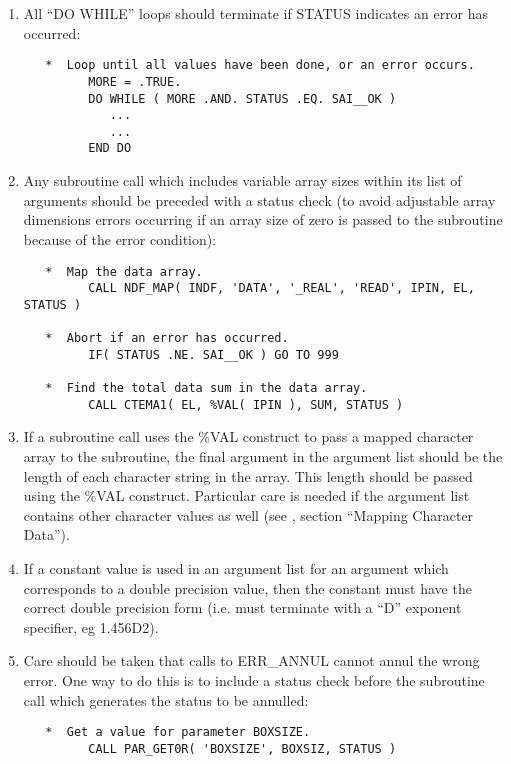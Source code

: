 \begin{enumerate}
\item All ``{\small DO WHILE}'' loops should terminate if {\small STATUS} 
indicates an error has occurred:

\small
\begin{verbatim}
   *  Loop until all values have been done, or an error occurs.
         MORE = .TRUE.
         DO WHILE ( MORE .AND. STATUS .EQ. SAI__OK ) 
            ...
            ...
         END DO
\end{verbatim}
\normalsize

\item Any subroutine call which includes variable array sizes within
its list of arguments should be preceded with a status check (to avoid
adjustable array dimensions errors occurring if an array size of zero
is passed to the subroutine because of the error condition):

\small
\begin{verbatim}
   *  Map the data array.
         CALL NDF_MAP( INDF, 'DATA', '_REAL', 'READ', IPIN, EL, STATUS )

   *  Abort if an error has occurred.
         IF( STATUS .NE. SAI__OK ) GO TO 999

   *  Find the total data sum in the data array.
         CALL CTEMA1( EL, %VAL( IPIN ), SUM, STATUS )
\end{verbatim}
\normalsize

\item If a subroutine call uses the {\small \%VAL} construct to pass a
mapped character array to the subroutine, the final argument in the
argument list should be the length of each character string in the
array. This length should be passed using the {\small \%VAL} construct.
Particular care is needed if the argument list contains other character
values as well
(see , section ``Mapping Character Data'').

\item If a constant value is used in an argument list for an argument
which corresponds to a double precision value, then the constant must
have the correct double precision form (i.e. must terminate with a
``D'' exponent specifier, eg 1.456D2).

\item Care should be taken that calls to {\small ERR\_ANNUL} cannot
annul the wrong error. One way to do this is to include a status check
before the subroutine call which generates the status to be annulled:

\small
\begin{verbatim}
   *  Get a value for parameter BOXSIZE.
         CALL PAR_GET0R( 'BOXSIZE', BOXSIZ, STATUS )


\end{verbatim}
\end{enumerate}
